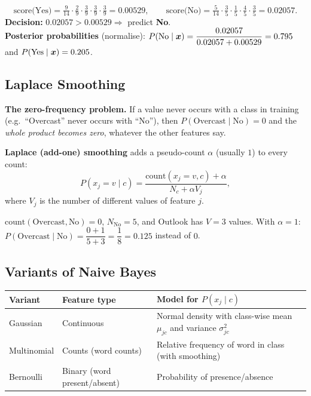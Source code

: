 \[
\text{score(Yes)}=\tfrac{9}{14}\cdot\tfrac29\cdot\tfrac39\cdot\tfrac39\cdot\tfrac39=0.00529,\qquad
\text{score(No)}=\tfrac{5}{14}\cdot\tfrac35\cdot\tfrac15\cdot\tfrac45\cdot\tfrac35=0.02057 .
\]
\textbf{Decision:} $0.02057>0.00529\Rightarrow$ predict \textbf{No}.\\
\textbf{Posterior probabilities} (normalise): $P(\text{No}\mid\boldsymbol{x})=\dfrac{0.02057}{0.02057+0.00529}=0.795$ and $P(\text{Yes}\mid\boldsymbol{x})=0.205$.


\subsection{Laplace Smoothing}

\begin{warning}
\textbf{The zero-frequency problem.} If a value never occurs with a class in training (e.g.\ ``Overcast'' never occurs with ``No''), then $P(\text{Overcast}\mid\text{No})=0$ and the \emph{whole product becomes zero}, whatever the other features say.
\end{warning}

\textbf{Laplace (add-one) smoothing} adds a pseudo-count $\alpha$ (usually $1$) to every count:
\[
  P(x_j=v\mid c)=\frac{\text{count}(x_j=v,c)+\alpha}{N_c+\alpha V_j},
\]
where $V_j$ is the number of different values of feature $j$.

\begin{example}[: Smoothing]
$\text{count}(\text{Overcast},\text{No})=0$, $N_{\text{No}}=5$, and Outlook has $V=3$ values. With $\alpha=1$: $P(\text{Overcast}\mid\text{No})=\dfrac{0+1}{5+3}=\dfrac18=0.125$ instead of $0$.
\end{example}

\subsection{Variants of Naive Bayes}

\begin{center}
\begin{tabular}{@{}p{3.4cm}p{4.6cm}p{5.2cm}@{}}
\toprule
\textbf{Variant} & \textbf{Feature type} & \textbf{Model for $P(x_j\mid c)$}\\
\midrule
Gaussian & Continuous & Normal density with class-wise mean $\mu_{jc}$ and variance $\sigma_{jc}^2$\\
Multinomial & Counts (word counts) & Relative frequency of word in class (with smoothing)\\
Bernoulli & Binary (word present/absent) & Probability of presence/absence\\
\bottomrule
\end{tabular}
\end{center}

